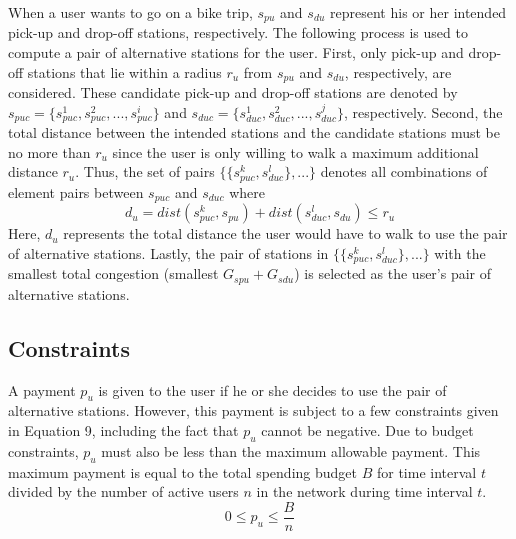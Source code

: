 \documentclass[times, 10pt,twocolumn]{article}
\begin{document}
When a user wants to go on a bike trip, $s_{pu}$ and $s_{du}$ represent his or her intended pick-up and drop-off stations, respectively. The following process is used to compute a pair of alternative stations for the user. First, only pick-up and drop-off stations that lie within a radius $r_u$ from $s_{pu}$ and $s_{du}$, respectively, are considered. These candidate pick-up and drop-off stations are denoted by $s_{puc} = \{s_{puc}^1, s_{puc}^2, ..., s_{puc}^i\}$ and $s_{duc} = \{s_{duc}^1, s_{duc}^2, ..., s_{duc}^j\}$, respectively. Second, the total distance between the intended stations and the candidate stations must be no more than $r_u$ since the user is only willing to walk a maximum additional distance $r_u$. Thus, the set of pairs $\{\{s_{puc}^k,s_{duc}^l\}, ...\}$ denotes all combinations of element pairs between $s_{puc}$ and $s_{duc}$ where
\begin{equation}
d_u = dist(s_{puc}^k, s_{pu}) + dist(s_{duc}^l, s_{du}) \leq r_u
\end{equation}
Here, $d_u$ represents the total distance the user would have to walk to use the pair of alternative stations.
Lastly, the pair of stations in $\{\{s_{puc}^k,s_{duc}^l\}, ...\}$ with the smallest total congestion (smallest $G_{spu}+G_{sdu}$) is selected as the user's pair of alternative stations.

\subsection{Constraints}
A payment $p_u$ is given to the user if he or she decides to use the pair of alternative stations. However, this payment is subject to a few constraints given in Equation 9, including the fact that $p_u$ cannot be negative. Due to budget constraints, $p_u$ must also be less than the maximum allowable payment. This maximum payment is equal to the total spending budget $B$ for time interval $t$ divided by the number of active users $n$ in the network during time interval $t$.
\begin{equation}
0 \leq p_u \leq \frac{B}{n}
\end{equation}
\end{document}
